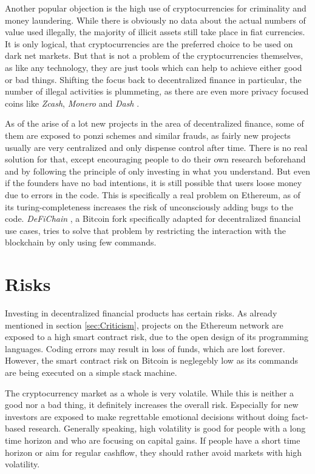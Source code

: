 Another popular objection is the high use of cryptocurrencies for criminality and money laundering. While there is obviously no data about the
actual numbers of value used illegally, the majority of illicit assets still take place in fiat currencies. It is only logical, that
cryptocurrencies are the preferred choice to be used on dark net markets. But that is not a problem of the cryptocurrencies themselves, as like any
technology, they are just tools which can help to achieve either good or bad things. Shifting the focus back to decentralized finance in particular,
the number of illegal activities is plummeting, as there are even more privacy focused coins like \textit{Zcash}, \textit{Monero} and \textit{Dash} \cite[p.\ 13]{FDD2018}.

As of the arise of a lot new projects in the area of decentralized finance, some of them are exposed to ponzi schemes and similar frauds, as
fairly new projects usually are very centralized and only dispense control after time. There is no real solution for that, except encouraging
people to do their own research beforehand and by following the principle of only investing in what you understand. But even if the founders
have no bad intentions, it is still possible that users loose money due to errors in the code. This is specifically a real problem on
Ethereum, as of its turing-completeness increases the risk of unconsciously adding bugs to the code. \textit{DeFiChain} \cite{DeFiChain}, 
a Bitcoin fork specifically adapted for decentralized financial use cases, tries to solve that problem by restricting the interaction with the
blockchain by only using few commands.

\section{Risks}
Investing in decentralized financial products has certain risks. As already mentioned in section \ref{sec:Criticism}, projects on the Ethereum
network are exposed to a high smart contract risk, due to the open design of its programming languages. Coding errors may result in loss of
funds, which are lost forever. However, the smart contract risk on Bitcoin is neglegebly low as its commands are being executed on a simple
stack machine.

The cryptocurrency market as a whole is very volatile. While this is neither a good nor a bad thing, it definitely increases the overall risk.
Especially for new investors are exposed to make regrettable emotional decisions without doing fact-based research. Generally speaking, high
volatility is good for people with a long time horizon and who are focusing on capital gains. If people have a short time horizon or aim for
regular cashflow, they should rather avoid markets with high volatility.

